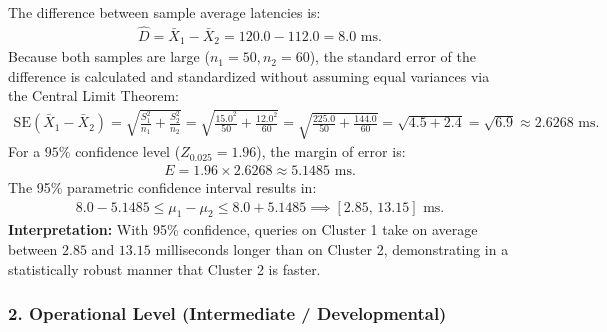 \begin{solucion}
	The difference between sample average latencies is:
	\begin{align}
		\hat{D} = \bar{X}_1 - \bar{X}_2 = 120.0 - 112.0 = 8.0 \text{ ms.}
	\end{align}
	Because both samples are large ($n_1 = 50, n_2 = 60$), the standard error of the difference is calculated and standardized without assuming equal variances via the Central Limit Theorem:
	\begin{align}
		\text{SE}(\bar{X}_1 - \bar{X}_2) = \sqrt{\frac{S_1^2}{n_1} + \frac{S_2^2}{n_2}} = \sqrt{\frac{15.0^2}{50} + \frac{12.0^2}{60}} = \sqrt{\frac{225.0}{50} + \frac{144.0}{60}} = \sqrt{4.5 + 2.4} = \sqrt{6.9} \approx 2.6268 \text{ ms.}
	\end{align}
	For a $95\%$ confidence level ($Z_{0.025} = 1.96$), the margin of error is:
	\begin{align}
		E = 1.96 \times 2.6268 \approx 5.1485 \text{ ms.}
	\end{align}
	The 95\% parametric confidence interval results in:
	\begin{align}
		8.0 - 5.1485 \le \mu_1 - \mu_2 \le 8.0 + 5.1485 \implies [2.85, \, 13.15] \text{ ms.}
	\end{align}
	\textbf{Interpretation:} With 95\% confidence, queries on Cluster 1 take on average between $2.85$ and $13.15$ milliseconds longer than on Cluster 2, demonstrating in a statistically robust manner that Cluster 2 is faster.
\end{solucion}

\subsubsection*{2. Operational Level (Intermediate / Developmental)}

